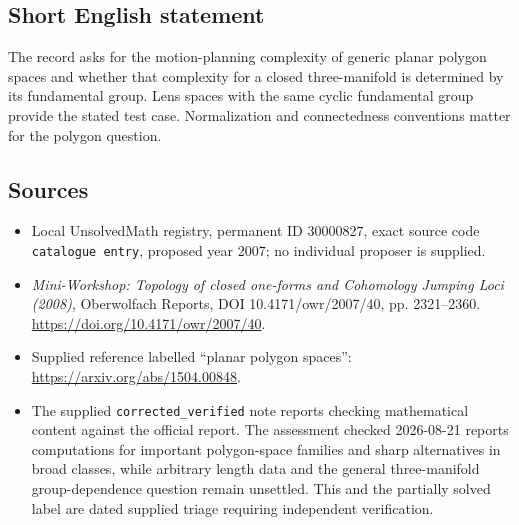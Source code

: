 \documentclass[11pt]{article}
\begin{document}
\subsection{Short English statement}
The record asks for the motion-planning complexity of generic planar polygon spaces and whether that complexity for a closed three-manifold is determined by its fundamental group. Lens spaces with the same cyclic fundamental group provide the stated test case. Normalization and connectedness conventions matter for the polygon question.
\subsection{Sources}
\begin{itemize}
\item Local UnsolvedMath registry, permanent ID \(30000827\), exact source code \texttt{catalogue entry}, proposed year 2007; no individual proposer is supplied.
\item \emph{Mini-Workshop: Topology of closed one-forms and Cohomology Jumping Loci (2008)}, Oberwolfach Reports, DOI 10.4171/owr/2007/40, pp. 2321--2360. \url{https://doi.org/10.4171/owr/2007/40}.
\item Supplied reference labelled ``planar polygon spaces'': \url{https://arxiv.org/abs/1504.00848}.
\item The supplied \texttt{corrected\_verified} note reports checking mathematical content against the official report. The assessment checked 2026-08-21 reports computations for important polygon-space families and sharp alternatives in broad classes, while arbitrary length data and the general three-manifold group-dependence question remain unsettled. This and the partially solved label are dated supplied triage requiring independent verification.
\end{itemize}
\end{document}
